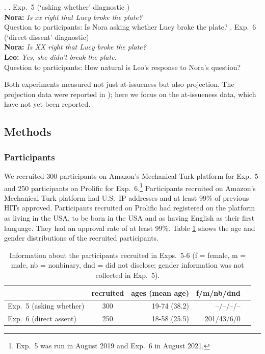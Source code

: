 \documentclass[times,linguex,xcolor]{glossa}
\begin{document}
    \ex.
    \a.\label{exp5} Exp.~5 (`asking whether' diagnostic )
    \\ {\bf Nora:} \emph{Is xx right that Lucy broke the plate?}
    \\ Question to participants: Is Nora asking whether Lucy broke the plate?
    \b.\label{exp6} Exp.~6 (`direct dissent' diagnostic)
    \\ {\bf Nora:} \emph{Is XX right that Lucy broke the plate?}
    \\ {\bf Leo:} \emph{Yes, she didn't break the plate.}
    \\ Question to participants: How natural is Leo's response to Nora's question?
    
  Both experiments measured not just at-issueness but also projection. The projection data were reported in \citealt{hofmann-etal2024}); here we focus on the at-issueness data, which have not yet been reported.

    \subsection{Methods}
    
    \subsubsection{Participants}

  We recruited 300 participants on Amazon's Mechanical Turk platform for Exp.~5 and 250 participants on Prolific for Exp.~6.\footnote{Exp.~5 was run in August 2019 and Exp.~6 in August 2021.} Participants recruited on Amazon's Mechanical Turk platform had U.S.\ IP addresses and at least 99\% of previous HITs approved. Participants recruited on Prolific had registered on the platform as living in the USA, to be born in the USA and as having English as their first language. They had an approval rate of at least 99\%.  Table \ref{t:recruited2} shows the age and gender distributions of the recruited participants.

      \begin{table}[h!]
      \centering
      \begin{tabular}{l | c | r r r }
                  & recruited & ages (mean age) & f/m/nb/dnd \\ \hline
      Exp.~5 (asking whether) & 300 & 19-74 (38.2) & --/--/--/--  \\
      Exp.~6 (direct assent) & 250 & 18-58 (25.5)  & 201/43/6/0  \\
      \hline
      \end{tabular}

      \caption{Information about the participants recruited in Exps.~5-6 (f = female, m = male, nb = nonbinary, dnd = did not disclose; gender information was not collected in Exp.~5).}\label{t:recruited2}
      \end{table}
\end{document}
